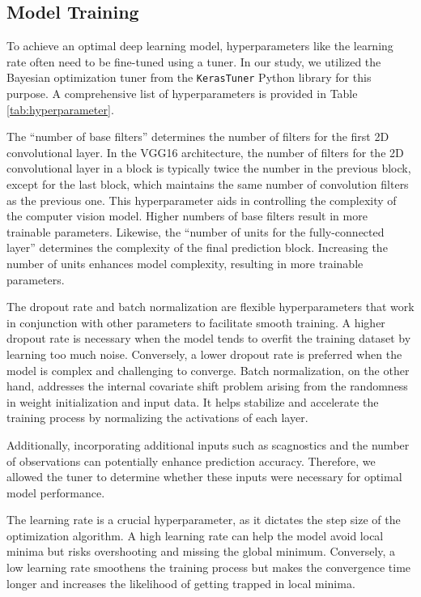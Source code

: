 \documentclass[]{interact}
\theoremstyle{plain}%
\theoremstyle{definition}
\theoremstyle{remark}
\begin{document}
\subsection{Model Training}\label{model-training}

To achieve an optimal deep learning model, hyperparameters like the
learning rate often need to be fine-tuned using a tuner. In our study,
we utilized the Bayesian optimization tuner from the \texttt{KerasTuner}
Python library \citep{omalley2019kerastuner} for this purpose. A
comprehensive list of hyperparameters is provided in Table
\ref{tab:hyperparameter}.

The ``number of base filters'' determines the number of filters for the
first 2D convolutional layer. In the VGG16 architecture, the number of
filters for the 2D convolutional layer in a block is typically twice the
number in the previous block, except for the last block, which maintains
the same number of convolution filters as the previous one. This
hyperparameter aids in controlling the complexity of the computer vision
model. Higher numbers of base filters result in more trainable
parameters. Likewise, the ``number of units for the fully-connected
layer'' determines the complexity of the final prediction block.
Increasing the number of units enhances model complexity, resulting in
more trainable parameters.

The dropout rate and batch normalization are flexible hyperparameters
that work in conjunction with other parameters to facilitate smooth
training. A higher dropout rate is necessary when the model tends to
overfit the training dataset by learning too much noise. Conversely, a
lower dropout rate is preferred when the model is complex and
challenging to converge. Batch normalization, on the other hand,
addresses the internal covariate shift problem arising from the
randomness in weight initialization and input data. It helps stabilize
and accelerate the training process by normalizing the activations of
each layer.

Additionally, incorporating additional inputs such as scagnostics and
the number of observations can potentially enhance prediction accuracy.
Therefore, we allowed the tuner to determine whether these inputs were
necessary for optimal model performance.

The learning rate is a crucial hyperparameter, as it dictates the step
size of the optimization algorithm. A high learning rate can help the
model avoid local minima but risks overshooting and missing the global
minimum. Conversely, a low learning rate smoothens the training process
but makes the convergence time longer and increases the likelihood of
getting trapped in local minima.
\end{document}
